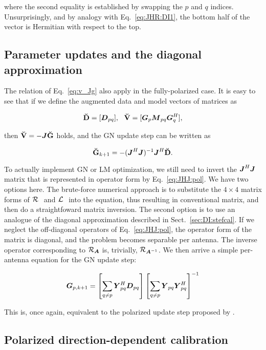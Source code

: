 \documentclass[useAMS,usenatbib]{mn2e}
\newcommand{\mat}[1]{{\bmath{#1}}}
\newcommand{\JJ}{\mat{J}} %
\newcommand{\DD}{\mat{D}}
\newcommand{\MM}{\mat{M}}
\newcommand{\GG}{\mat{G}}
\newcommand{\JHJ}{\JJ^H\JJ} %
\newcommand{\StefCal}{{\sc StefCal}}
\begin{document}
where the second equality is established by swapping the $p$ and $q$ indices. Unsurprisingly, and by analogy with 
Eq.~\ref{eq:JHR:DI1}, the bottom half of the vector is Hermitian with respect to the top.

\subsection{Parameter updates and the diagonal approximation}

The relation of Eq.~\ref{eq:v_Jg} also apply in the fully-polarized case. It is easy to see that if we define the augmented 
data and model vectors of matrices as

\[
\DDd = [ \DD_{pq} ],~~\VVv = [ \GG_p \MM_{pq} \GG_q^H ],
\]

then $\VVv = -\JJ \GGg$ holds, and the GN update step can be written as

\[
\GGg_{k+1} = - (\JHJ)^{-1} \JJ^H \DDd.
\]


To actually implement GN or LM optimization, we still need to invert the  $\JHJ$ matrix that is represented in operator form 
by Eq.~\ref{eq:JHJ:pol}. We have two options here. The brute-force numerical approach is to substitute the 
$4\times4$ matrix forms of $\mathcal{R}_{{~}}$ and $\mathcal{L}_{{~}}$ into the equation, thus resulting in conventional matrix,
and then do a straightfoward matrix inversion. The second option is to use an analogue of the diagonal 
approximation described in Sect.~\ref{sec:DI:stefcal}. If we neglect the off-diagonal operators of Eq.~\ref{eq:JHJ:pol}, 
the operator form of the matrix is diagonal, and the problem becomes separable per antenna. The inverse operator 
corresponding to $\Rop{\mat{A}}$ is, trivially, $\Rop{\mat{A}^{-1}}$. We then arrive a simple per-antenna equation 
for the GN update step:

\begin{equation}
\label{eq:update:DI:diag:pol}
\GG_{p,k+1} = \left [ \sum\limits_{q\ne p} \YY^H_{pq} \DD_{pq} \right ] 
\left [ \sum\limits_{q\ne p} \YY_{pq} \YY^H_{pq}  \right ]^{-1}
\end{equation}

This is, once again, equivalent to the polarized {\sc \StefCal} update step proposed by \citet{Stefcal}.




\subsection{Polarized direction-dependent calibration}
\end{document}
